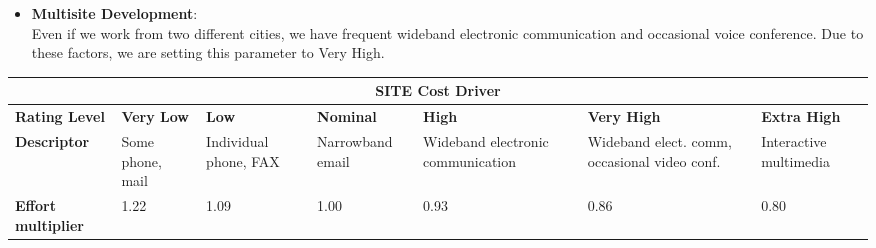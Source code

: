\begin{itemize}
\item \textbf{Multisite Development}:\\
Even if we work from two different cities, we have frequent wideband electronic communication and occasional voice conference. Due to these factors, we are setting this parameter to Very High.
\end{itemize}
\hspace*{-3cm}\begin{tabular}{|p{3cm}|p{2cm}|p{2cm}|p{2cm}|p{2cm}|p{2cm}|p{2cm}|}
\hline
\multicolumn{7}{|c|}{\textbf{SITE Cost Driver}}\\
\hline
\hline
\textbf{Rating Level} & \textbf{Very Low} & \textbf{Low} & \textbf{Nominal} & \textbf{High} & \textbf{Very High} & \textbf{Extra High}\\
\hline
\textbf{Descriptor} & Some phone, mail & Individual phone, FAX & Narrowband email & Wideband electronic communication & Wideband elect. comm, occasional video conf. & Interactive multimedia\\
\hline
\textbf{Effort multiplier} & 1.22 & 1.09 & 1.00 & 0.93 & 0.86 & 0.80\\
\hline 
\end{tabular}
